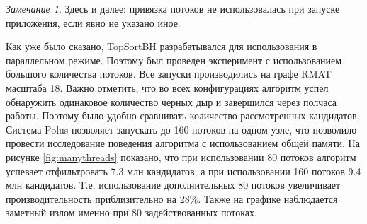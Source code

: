 \documentclass[12pt,a4paper,oneside,openany]{article}
\theoremstyle{definition}
\theoremstyle{lemma}
\theoremstyle{remark}
\newtheorem{remark}{Замечание}[]
\begin{document}
\begin{remark}
    Здесь и далее: привязка потоков не использовалась при запуске приложения, если явно не указано иное.
\end{remark}

Как уже было сказано, TopSortBH разрабатывался для использования в параллельном режиме. Поэтому
был проведен эксперимент с использованием большого количества потоков.
Все запуски производились на графе RMAT масштаба 18.
Важно отметить, что во всех конфигурациях алгоритм успел обнаружить одинаковое количество черных дыр
и завершился через полчаса работы. Поэтому было удобно сравнивать количество рассмотренных кандидатов.
Система Polus позволяет запускать до 160 потоков на одном узле, что позволило провести исследование
поведения алгоритма с использованием общей памяти.
На рисунке \ref{fig:manythreads} показано, что при использовании 80 потоков алгоритм успевает
отфильтровать 7.3 млн кандидатов, а при использовании 160 потоков 9.4 млн кандидатов. Т.е. использование
дополнительных 80 потоков увеличивает производительность приблизительно на 28\%. Также на графике наблюдается
заметный излом именно при 80 задействованных потоках.
\end{document}
